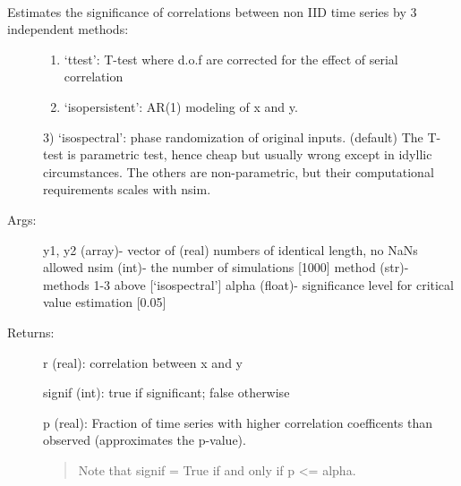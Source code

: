 \documentclass[letterpaper,10pt,english]{sphinxmanual}
\begin{document}
\begin{fulllineitems}
\label{\detokenize{Stats:pyleoclim.Stats.corrsig}}~\begin{description}
\item[{Estimates the significance of correlations between non IID time series by 3 independent methods:}] \leavevmode\begin{enumerate}
\def\theenumi{\arabic{enumi}}
\def\labelenumi{\theenumi )}
\makeatletter\def\p@enumii{\p@enumi \theenumi )}\makeatother
\item {} 
‘ttest’: T-test where d.o.f are corrected for the effect of serial correlation

\item {} 
‘isopersistent’: AR(1) modeling of x and y.

\end{enumerate}

3) ‘isospectral’: phase randomization of original inputs. (default)
The T-test is parametric test, hence cheap but usually wrong except in idyllic circumstances.
The others are non-parametric, but their computational requirements scales with nsim.

\item[{Args:}] \leavevmode
y1, y2 (array)- vector of (real) numbers of identical length, no NaNs allowed
nsim (int)- the number of simulations {[}1000{]}
method (str)- methods 1-3 above {[}‘isospectral’{]}
alpha (float)- significance level for critical value estimation {[}0.05{]}

\item[{Returns:}] \leavevmode
r (real): correlation between x and y

signif (int): true  if significant; false otherwise

p (real): Fraction of time series with higher correlation coefficents than observed (approximates the p-value).
\begin{quote}

Note that signif = True if and only if p \textless{}= alpha.
\end{quote}

\end{description}

\end{fulllineitems}
\end{document}
